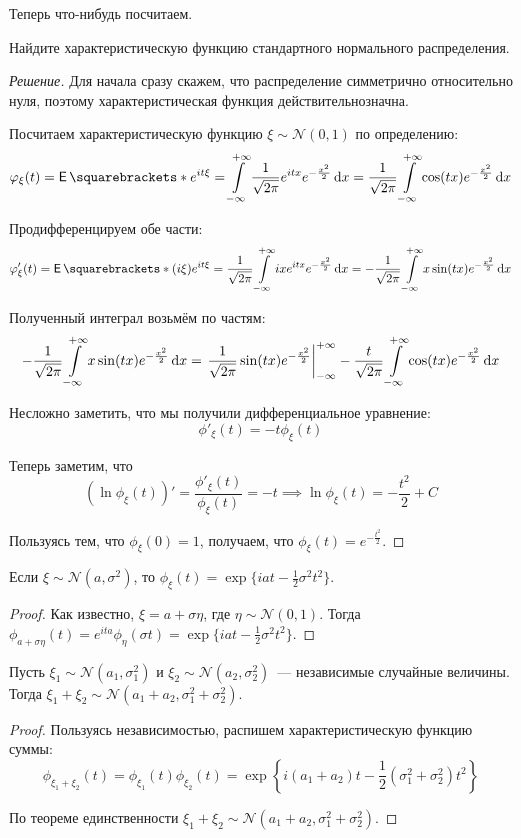 Теперь что-нибудь посчитаем.
\begin{problem}
	Найдите характеристическую функцию стандартного нормального распределения.
\end{problem}
\begin{proof}[Решение]
	Для начала сразу скажем, что распределение симметрично относительно нуля, 
	поэтому характеристическая функция действительнозначна.
	
	Посчитаем характеристическую функцию \(\xi \sim \mathcal{N}(0, 1)\) по 
	определению:
	\[
		\phi_{\xi}(t) = \E{e^{it\xi}} = \int\limits_{-\infty}^{+\infty} 
		\frac{1}{\sqrt{2\pi}}e^{itx}e^{-\frac{x^2}{2}}\diff x = 
		\frac{1}{\sqrt{2\pi}}\int\limits_{-\infty}^{+\infty} 
		\cos(tx)e^{-\frac{x^2}{2}}\diff x
	\]
	
	Продифференцируем обе части:
	\[
		\phi'_{\xi}(t) = \E{(i\xi)e^{it\xi}} = 
		\frac{1}{\sqrt{2\pi}}\int\limits_{-\infty}^{+\infty} 
		ixe^{itx}e^{-\frac{x^2}{2}}\diff x = 
		-\frac{1}{\sqrt{2\pi}}\int\limits_{-\infty}^{+\infty} 
		x\sin(tx)e^{-\frac{x^2}{2}}\diff x
	\]
	
	Полученный интеграл возьмём по частям:
	\[
		-\frac{1}{\sqrt{2\pi}}\int\limits_{-\infty}^{+\infty} 
		x\sin(tx)e^{-\frac{x^2}{2}}\mathop{}\!\mathrm{d} x = 
		\left. \frac{1}{\sqrt{2\pi}} \sin(tx) e^{-\frac{x^2}{2}} 
		\right|_{-\infty}^{+\infty} - 
		\frac{t}{\sqrt{2\pi}}\int\limits_{-\infty}^{+\infty} 
		\cos(tx)e^{-\frac{x^2}{2}}\mathop{}\!\mathrm{d} x
	\]
	
	Несложно заметить, что мы получили дифференциальное уравнение:
	\[
		\phi'_{\xi}(t) = -t\phi_{\xi}(t)
	\]
	
	Теперь заметим, что
	\[
		\left(\ln \phi_{\xi}(t)\right)' = \frac{\phi'_{\xi}(t)}{\phi_{\xi}(t)} 
		= -t \implies \ln \phi_{\xi}(t) = -\frac{t^2}{2} + C
	\]
	
	Пользуясь тем, что \(\phi_{\xi}(0) = 1\), получаем, что \(\phi_{\xi}(t) = 
	e^{-\frac{t^2}{2}}\).
\end{proof}

\begin{consequence}
	Если \(\xi \sim \mathcal{N}(a, \sigma^2)\), то \(\phi_{\xi}(t) = \exp\{iat 
	- \frac{1}{2}\sigma^2 t^2\}\).
\end{consequence}
\begin{proof}
	Как известно, \(\xi = a + \sigma\eta\), где \(\eta \sim \mathcal{N}(0, 
	1)\). Тогда \(\phi_{a + \sigma \eta}(t) = e^{ita}\phi_{\eta}(\sigma t) = 
	\exp\{iat - \frac{1}{2}\sigma^2 t^2\}\).
\end{proof}
\begin{consequence}
	Пусть \(\xi_1 \sim \mathcal{N}(a_1, \sigma_1^2)\) и \(\xi_2 \sim 
	\mathcal{N}(a_2, \sigma_2^2)\)~--- независимые случайные величины. Тогда 
	\(\xi_1 + \xi_2 \sim \mathcal{N}(a_1 + a_2, \sigma_1^2 + \sigma_2^2)\).
\end{consequence}
\begin{proof}
	Пользуясь независимостью, распишем характеристическую функцию суммы:
	\[
		\phi_{\xi_1 + \xi_2}(t) = \phi_{\xi_1}(t)\phi_{\xi_2}(t) = 
		\exp\left\{i(a_1 + a_2)t - \frac{1}{2}(\sigma_1^2 
		+\sigma_2^2)t^2\right\}
	\]
	
	По теореме единственности \(\xi_1 + \xi_2 \sim \mathcal{N}(a_1 + a_2, 
	\sigma_1^2 + \sigma_2^2)\).
\end{proof}

